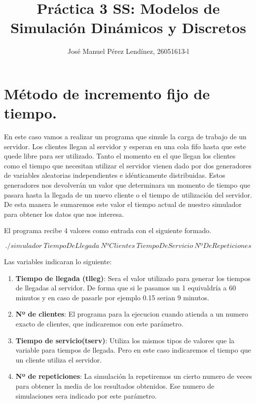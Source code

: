 \documentclass[]{article}
\title{Práctica 3 SS: Modelos de Simulación Dinámicos y Discretos}
\author{José Manuel Pérez Lendínez, 26051613-l}
\begin{document}
	\maketitle
	
	
	\newpage
	\tableofcontents
	\newpage

\section{Método de incremento fijo de tiempo.}
En este caso vamos a realizar un programa que simule la carga de trabajo de un servidor. Los clientes llegan al servidor y esperan en una cola fifo hasta que este quede libre para ser utilizado. Tanto el momento en el que llegan los clientes como el tiempo que necesitan utilizar el servidor vienen dado por dos generadores de variables aleatorias independientes e idénticamente distribuidas. Estos generadores nos devolverán un valor que determinara un momento de tiempo que pasara hasta la llegada de un nuevo cliente o el tiempo de utilización del servidor. De esta manera le sumaremos este valor el tiempo actual de nuestro simulador para obtener los datos que nos interesa. 

El programa recibe 4 valores como entrada con el siguiente formado.

$$./simulador\ TiempoDeLlegada\ NºClientes\ TiempoDeServicio\ NºDeRepeticiones$$


Las variables indicaran lo siguiente:
	\begin{enumerate}
		\item \textbf{Tiempo de llegada (tlleg)}: Sera el valor utilizado para generar los tiempos de llegadas al servidor. De forma que si le pasamos un 1 equivaldría a 60 minutos y en caso de pasarle por ejemplo 0.15 serian 9 minutos.
		\item \textbf{Nº de clientes}: El programa para la ejecucion cuando atienda a un numero exacto de clientes, que indicaremos con este parámetro.
		\item \textbf{Tiempo de servicio(tserv)}: Utiliza los mismos tipos de valores que la variable para tiempos de llegada. Pero en este caso indicaremos el tiempo que un cliente utiliza el servidor.
		\item \textbf{Nº de repeticiones}: La simulación la repetiremos un cierto numero de veces para obtener la media de los resultados obtenidos. Ese numero de simulaciones sera indicado por este parámetro.
	\end{enumerate}
\end{document}
